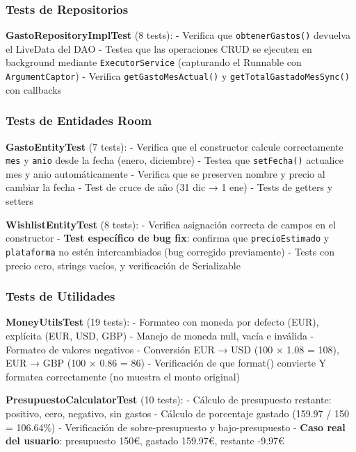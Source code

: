 \documentclass[
  spanish,
  11pt,
  paper=a4,
  ,captions=tableheading
]{scrartcl}
\begin{document}
\hypertarget{tests-de-repositorios}{%
\subsubsection{Tests de Repositorios}\label{tests-de-repositorios}}

\textbf{GastoRepositoryImplTest} (8 tests): - Verifica que
\texttt{obtenerGastos()} devuelva el LiveData del DAO - Testea que las
operaciones CRUD se ejecuten en background mediante
\texttt{ExecutorService} (capturando el Runnable con
\texttt{ArgumentCaptor}) - Verifica \texttt{getGastoMesActual()} y
\texttt{getTotalGastadoMesSync()} con callbacks

\hypertarget{tests-de-entidades-room}{%
\subsubsection{Tests de Entidades Room}\label{tests-de-entidades-room}}

\textbf{GastoEntityTest} (7 tests): - Verifica que el constructor
calcule correctamente \texttt{mes} y \texttt{anio} desde la fecha
(enero, diciembre) - Testea que \texttt{setFecha()} actualice mes y anio
automáticamente - Verifica que se preserven nombre y precio al cambiar
la fecha - Test de cruce de año (31 dic → 1 ene) - Tests de getters y
setters

\textbf{WishlistEntityTest} (8 tests): - Verifica asignación correcta de
campos en el constructor - \textbf{Test específico de bug fix}: confirma
que \texttt{precioEstimado} y \texttt{plataforma} no estén
intercambiados (bug corregido previamente) - Tests con precio cero,
strings vacíos, y verificación de Serializable

\hypertarget{tests-de-utilidades}{%
\subsubsection{Tests de Utilidades}\label{tests-de-utilidades}}

\textbf{MoneyUtilsTest} (19 tests): - Formateo con moneda por defecto
(EUR), explícita (EUR, USD, GBP) - Manejo de moneda null, vacía e
inválida - Formateo de valores negativos - Conversión EUR → USD (100 ×
1.08 = 108), EUR → GBP (100 × 0.86 = 86) - Verificación de que format()
convierte Y formatea correctamente (no muestra el monto original)

\textbf{PresupuestoCalculatorTest} (10 tests): - Cálculo de presupuesto
restante: positivo, cero, negativo, sin gastos - Cálculo de porcentaje
gastado (159.97 / 150 = 106.64\%) - Verificación de sobre-presupuesto y
bajo-presupuesto - \textbf{Caso real del usuario}: presupuesto 150€,
gastado 159.97€, restante -9.97€
\end{document}
